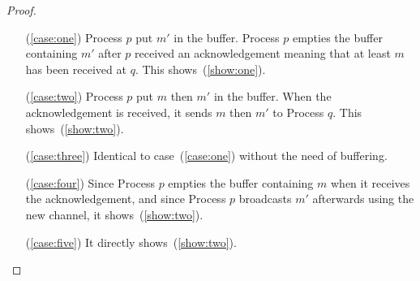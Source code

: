 \begin{proof}
  \begin{itemize}
  \item [(\ref{case:one})] Process $p$ put $m'$ in the buffer. Process $p$
    empties the buffer containing $m'$ after $p$ received an acknowledgement
    meaning that at least $m$ has been received at $q$. This
    shows~(\ref{show:one}).
  \item [(\ref{case:two})] Process $p$ put $m$ then $m'$ in the buffer. When the
    acknowledgement is received, it sends $m$ then $m'$ to Process $q$. This
    shows~(\ref{show:two}).
  \item [(\ref{case:three})] Identical to case~(\ref{case:one}) without the need
    of buffering.
  \item [(\ref{case:four})] Since Process $p$ empties the buffer containing $m$
    when it receives the acknowledgement, and since Process $p$ broadcasts $m'$
    afterwards using the new channel, it shows~(\ref{show:two}).
  \item [(\ref{case:five})] It directly shows~(\ref{show:two}).
  \end{itemize}

\end{proof}
